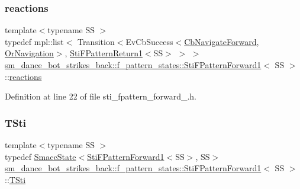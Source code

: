 \subsubsection{\texorpdfstring{reactions}{reactions}}
{\footnotesize\ttfamily template$<$typename SS $>$ \\
typedef mpl\+::list$<$ Transition$<$Ev\+Cb\+Success$<$\hyperlink{classcl__move__base__z_1_1CbNavigateForward}{Cb\+Navigate\+Forward}, \hyperlink{classsm__dance__bot__strikes__back_1_1OrNavigation}{Or\+Navigation}$>$, \hyperlink{structsm__dance__bot__strikes__back_1_1f__pattern__states_1_1StiFPatternReturn1}{Sti\+F\+Pattern\+Return1}$<$SS$>$ $>$ $>$ \hyperlink{structsm__dance__bot__strikes__back_1_1f__pattern__states_1_1StiFPatternForward1}{sm\+\_\+dance\+\_\+bot\+\_\+strikes\+\_\+back\+::f\+\_\+pattern\+\_\+states\+::\+Sti\+F\+Pattern\+Forward1}$<$ SS $>$\+::\hyperlink{structsm__dance__bot__strikes__back_1_1f__pattern__states_1_1StiFPatternForward1_a15622eba77548660934a40ec88591a4f}{reactions}}



Definition at line 22 of file sti\+\_\+fpattern\+\_\+forward\+\_.\+h.

\mbox{\label{structsm__dance__bot__strikes__back_1_1f__pattern__states_1_1StiFPatternForward1_a30d04bd6c724d937fdbb5ca3f1ee3bbd}} 
\subsubsection{\texorpdfstring{T\+Sti}{TSti}}
{\footnotesize\ttfamily template$<$typename SS $>$ \\
typedef \hyperlink{classSmaccState}{Smacc\+State}$<$\hyperlink{structsm__dance__bot__strikes__back_1_1f__pattern__states_1_1StiFPatternForward1}{Sti\+F\+Pattern\+Forward1}$<$SS$>$, SS$>$ \hyperlink{structsm__dance__bot__strikes__back_1_1f__pattern__states_1_1StiFPatternForward1}{sm\+\_\+dance\+\_\+bot\+\_\+strikes\+\_\+back\+::f\+\_\+pattern\+\_\+states\+::\+Sti\+F\+Pattern\+Forward1}$<$ SS $>$\+::\hyperlink{structsm__dance__bot__strikes__back_1_1f__pattern__states_1_1StiFPatternForward1_a30d04bd6c724d937fdbb5ca3f1ee3bbd}{T\+Sti}}



